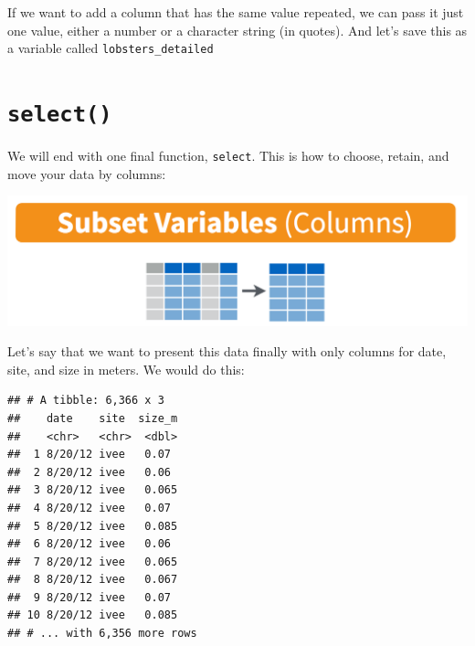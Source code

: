 \documentclass[]{book}
\newenvironment{Shaded}{\begin{snugshade}}{\end{snugshade}}
\newcommand{\DataTypeTok}[1]{\textcolor[rgb]{0.13,0.29,0.53}{#1}}
\newcommand{\DecValTok}[1]{\textcolor[rgb]{0.00,0.00,0.81}{#1}}
\newcommand{\KeywordTok}[1]{\textcolor[rgb]{0.13,0.29,0.53}{\textbf{#1}}}
\newcommand{\NormalTok}[1]{#1}
\newcommand{\OperatorTok}[1]{\textcolor[rgb]{0.81,0.36,0.00}{\textbf{#1}}}
\newcommand{\StringTok}[1]{\textcolor[rgb]{0.31,0.60,0.02}{#1}}
\begin{document}
If we want to add a column that has the same value repeated, we can pass it just one value, either a number or a character string (in quotes). And let's save this as a variable called \texttt{lobsters\_detailed}

\begin{Shaded}
\end{Shaded}

\hypertarget{select}{%
\section{\texorpdfstring{\texttt{select()}}{select()}}\label{select}}

We will end with one final function, \texttt{select}. This is how to choose, retain, and move your data by columns:

\includegraphics[width=0.8\linewidth]{img/rstudio-cheatsheet-select}

Let's say that we want to present this data finally with only columns for date, site, and size in meters. We would do this:

\begin{Shaded}
\end{Shaded}

\begin{verbatim}
## # A tibble: 6,366 x 3
##    date    site  size_m
##    <chr>   <chr>  <dbl>
##  1 8/20/12 ivee   0.07 
##  2 8/20/12 ivee   0.06 
##  3 8/20/12 ivee   0.065
##  4 8/20/12 ivee   0.07 
##  5 8/20/12 ivee   0.085
##  6 8/20/12 ivee   0.06 
##  7 8/20/12 ivee   0.065
##  8 8/20/12 ivee   0.067
##  9 8/20/12 ivee   0.07 
## 10 8/20/12 ivee   0.085
## # ... with 6,356 more rows
\end{verbatim}
\end{document}
